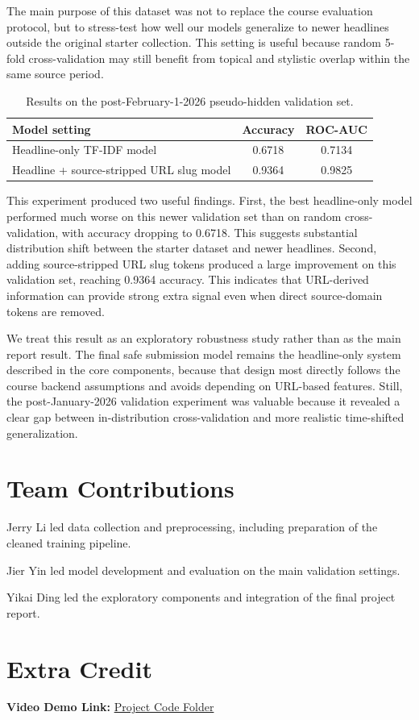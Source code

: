 \documentclass[10pt]{article}
\begin{document}
The main purpose of this dataset was not to replace the course evaluation protocol, but to stress-test how well our models generalize to newer headlines outside the original starter collection. This setting is useful because random 5-fold cross-validation may still benefit from topical and stylistic overlap within the same source period.

\begin{table}[h]
\centering
\small
\begin{tabular}{lcc}
\hline
Model setting & Accuracy & ROC-AUC \\
\hline
Headline-only TF-IDF model & 0.6718 & 0.7134 \\
Headline + source-stripped URL slug model & 0.9364 & 0.9825 \\
\hline
\end{tabular}
\caption{Results on the post-February-1-2026 pseudo-hidden validation set.}
\label{tab:recent-validation-results}
\end{table}

This experiment produced two useful findings. First, the best headline-only model performed much worse on this newer validation set than on random cross-validation, with accuracy dropping to 0.6718. This suggests substantial distribution shift between the starter dataset and newer headlines. Second, adding source-stripped URL slug tokens produced a large improvement on this validation set, reaching 0.9364 accuracy. This indicates that URL-derived information can provide strong extra signal even when direct source-domain tokens are removed.

We treat this result as an exploratory robustness study rather than as the main report result. The final safe submission model remains the headline-only system described in the core components, because that design most directly follows the course backend assumptions and avoids depending on URL-based features. Still, the post-January-2026 validation experiment was valuable because it revealed a clear gap between in-distribution cross-validation and more realistic time-shifted generalization.

\section{Team Contributions}
Jerry Li led data collection and preprocessing, including preparation of the cleaned training pipeline.

Jier Yin led model development and evaluation on the main validation settings.

Yikai Ding led the exploratory components and integration of the final project report.

\section{Extra Credit}
\textbf{Video Demo Link:} \href{https://drive.google.com/drive/folders/13gnLsAkTN4MkBU17H3Kkb2pxDgQ4y-Hy}{Project Code Folder}
\end{document}
